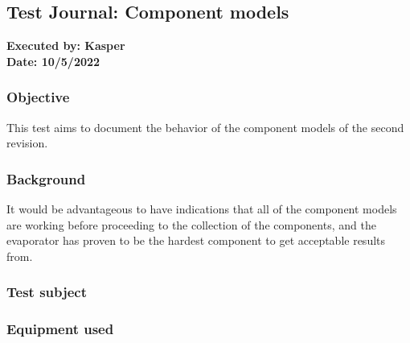 \subsection{Test Journal: Component models} \label{app:tj_0}

\textbf{Executed by: Kasper} \\
\textbf{Date: 10/5/2022}

\subsubsection{Objective}
This test aims to document the behavior of the component models of the second revision. 

\subsubsection{Background}

It would be advantageous to have indications that all of the component models are working before proceeding to the collection of the components, and the evaporator has proven to be the hardest component to get acceptable results from.

\subsubsection{Test subject}

\subsubsection{Equipment used}

